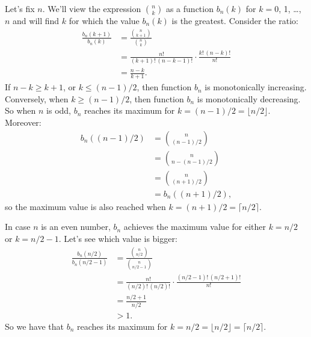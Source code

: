 Let's fix $n$.
We'll view the expression $\binom{n}{k}$ as a function $b_n(k)$ for $k=0$, 1, \dots, $n$ and will find $k$ for which the value $b_n(k)$ is the greatest.
Consider the ratio:
\begin{align*}
    \frac{b_n(k+1)}{b_n(k)} &= \frac{\binom{n}{k+1}}{\binom{n}{k}} \\
    &= \frac{n!}{(k+1)!\,(n-k-1)!}\cdot\frac{k!\,(n-k)!}{n!} \\[1mm]
    &= \frac{n-k}{k+1}.
\end{align*}
If $n-k\ge k+1$, or $k\le(n-1)/2$, then function $b_n$ is monotonically increasing.
Conversely, when $k\ge(n-1)/2$, then function $b_n$ is monotonically decreasing.
So when $n$ is odd, $b_n$ reaches its maximum for $k=(n-1)/2=\lfloor n/2\rfloor$.
Moreover:
\begin{align*}
    b_n((n-1)/2) &= \binom{n}{(n-1)/2} \\
    &= \binom{n}{n-(n-1)/2} \tag{by equation (C.3)} \\
    &= \binom{n}{(n+1)/2} \\
    &= b_n((n+1)/2),
\end{align*}
so the maximum value is also reached when $k=(n+1)/2=\lceil n/2\rceil$.

In case $n$ is an even number, $b_n$ achieves the maximum value for either $k=n/2$ or $k=n/2-1$.
Let's see which value is bigger:
\begin{align*}
    \frac{b_n(n/2)}{b_n(n/2-1)} &= \frac{\binom{n}{n/2}}{\binom{n}{n/2-1}} \\
    &= \frac{n!}{(n/2)!\,(n/2)!}\cdot\frac{(n/2-1)!\,(n/2+1)!}{n!} \\[2mm]
    &= \frac{n/2+1}{n/2} \\
    &> 1.
\end{align*}
So we have that $b_n$ reaches its maximum for $k=n/2=\lfloor n/2\rfloor=\lceil n/2\rceil$.
